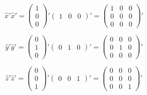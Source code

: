\documentclass[12pt]{article}
\begin{document}
\begin{displaymath}{\hat{x}'\hat{x}'= \left(\begin{array}{c} 1 \\ 0 \\ 0 \end{array}\right)'\left(\begin{array}{ccc} 1 & 0 & 0 \end{array}\right)'=\left(\begin{array}{ccc} 1 & 0 & 0 \\ 0 & 0 & 0 \\ 0 & 0 & 0 \end{array}\right)'}\end{displaymath}

\begin{displaymath}{\hat{y}'\hat{y}'= \left(\begin{array}{c} 0 \\ 1 \\ 0 \end{array}\right)'\left(\begin{array}{ccc} 0 & 1 & 0 \end{array}\right)'=\left(\begin{array}{ccc} 0 & 0 & 0 \\ 0 & 1 & 0 \\ 0 & 0 & 0 \end{array}\right)'}\end{displaymath}

\begin{displaymath}{\hat{z}'\hat{z}'= \left(\begin{array}{c} 0 \\ 0 \\ 1 \end{array}\right)'\left(\begin{array}{ccc} 0 & 0 & 1 \end{array}\right)'=\left(\begin{array}{ccc} 0 & 0 & 0 \\ 0 & 0 & 0 \\ 0 & 0 & 1 \end{array}\right)'}\end{displaymath}
\end{document}
